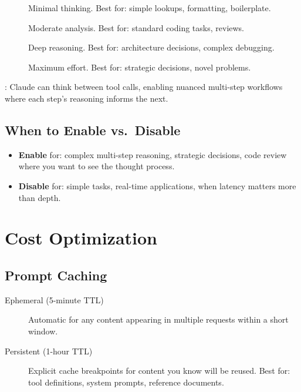 \begin{description}
  \item[] Minimal thinking. Best for: simple lookups, formatting, boilerplate.
  \item[] Moderate analysis. Best for: standard coding tasks, reviews.
  \item[] Deep reasoning. Best for: architecture decisions, complex debugging.
  \item[] Maximum effort. Best for: strategic decisions, novel problems.
\end{description}

: Claude can think between tool calls,
enabling nuanced multi-step workflows where each step's reasoning
informs the next.

\subsection{When to Enable vs.\ Disable}

\begin{itemize}
  \item \textbf{Enable} for: complex multi-step reasoning, strategic decisions,
    code review where you want to see the thought process.
  \item \textbf{Disable} for: simple tasks, real-time applications,
    when latency matters more than depth.
\end{itemize}

\section{Cost Optimization}
\label{sec:cost}


\subsection{Prompt Caching}


\begin{description}
  \item[Ephemeral (5-minute TTL)] Automatic for any content appearing in
    multiple requests within a short window.
  \item[Persistent (1-hour TTL)] Explicit cache breakpoints for content you know
    will be reused. Best for: tool definitions, system prompts, reference documents.
\end{description}


